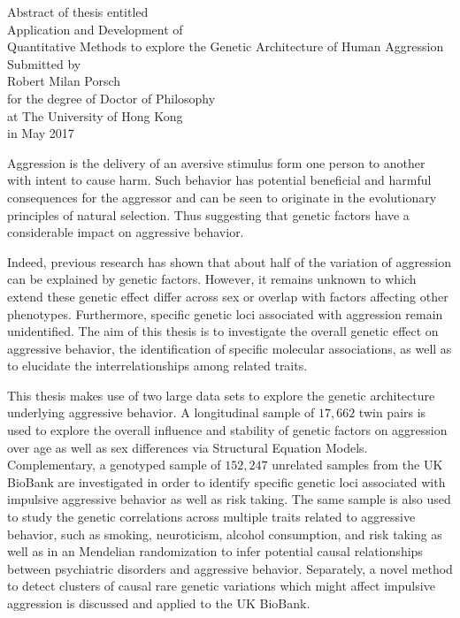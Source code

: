 \documentclass[header.tex]{subfiles}
\begin{document}
\begin{center}
  Abstract of thesis entitled \\
  \vspace*{\baselineskip}
  {\LARGE Application and Development of \\ Quantitative Methods to explore the Genetic Architecture of Human Aggression}\\[0.2\baselineskip]
  \vspace*{\baselineskip}
  Submitted by\\
  \vspace*{\baselineskip}
  {\LARGE Robert Milan Porsch}\\
  \vspace*{\baselineskip}
  for the degree of Doctor of Philosophy \\ at The University of Hong Kong \\ in May 2017
\end{center}


Aggression is the delivery of an aversive stimulus form one person to another with intent to cause harm.
Such behavior has potential beneficial and harmful consequences for the aggressor and can be seen to originate in the evolutionary principles of natural selection.
Thus suggesting that genetic factors have a considerable impact on aggressive behavior.

Indeed, previous research has shown that about half of the variation of aggression can be explained by genetic factors.
However, it remains unknown to which extend these genetic effect differ across sex or overlap with factors affecting other phenotypes.
Furthermore, specific genetic loci associated with aggression remain unidentified.
The aim of this thesis is to investigate the overall genetic effect on aggressive behavior, the identification of specific molecular associations, as well as to elucidate the interrelationships among related traits. 

This thesis makes use of two large data sets to explore the genetic architecture underlying aggressive behavior.
A longitudinal sample of $17,662$ twin pairs is used to explore the overall influence and stability of genetic factors on aggression over age as well as sex differences via Structural Equation Models.
Complementary, a genotyped sample of $152,247$ unrelated samples from the UK BioBank are investigated in order to identify specific genetic loci associated with impulsive aggressive behavior as well as risk taking.
The same sample is also used to study the genetic correlations across multiple traits related to aggressive behavior, such as smoking, neuroticism, alcohol consumption, and risk taking as well as in an Mendelian randomization to infer potential causal relationships between psychiatric disorders and aggressive behavior.
Separately, a novel method to detect clusters of causal rare genetic variations which might affect impulsive aggression is discussed and applied to the UK BioBank. 
\end{document}
